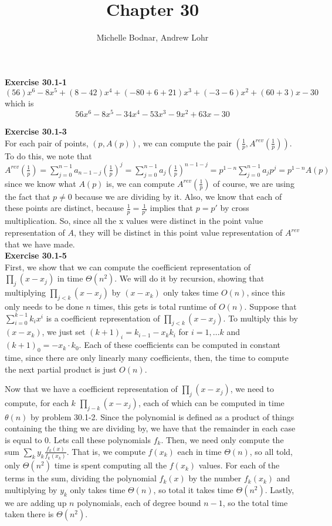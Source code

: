 \documentclass{article}
\title{Chapter 30}
\author{Michelle Bodnar, Andrew Lohr}
\begin{document}
\maketitle
\noindent\textbf{Exercise 30.1-1}\\
\[
(56)x^6 -8x^5 + (8-42)x^4 + (-80 + 6+21)x^3 + (-3-6)x^2 + (60+3)x -30
\]
which is 
\[
56x^6 - 8 x^5 -34x^4 - 53 x^3-9x^2+63x-30
\]

\noindent\textbf{Exercise 30.1-3}\\
For each pair of points, $(p,A(p))$, we can compute the pair $(\frac{1}{p}, A^{rev}(\frac{1}{p}))$. To do this, we note that $A^{rev}(\frac{1}{p}) = \sum_{j=0}^{n-1} a_{n-1-j} \left(\frac{1}{p}\right)^j = \sum_{j=0}^{n-1} a_{j} \left( \frac{1}{p}\right)^{n-1-j} = p^{1-n} \sum_{j=0}^{n-1} a_j p^j = p^{1-n} A(p)$ since we know what $A(p)$ is, we can compute $A^{rev}(\frac{1}{p})$ of course, we are using the fact that $p\neq0$ because we are dividing by it. Also, we know that each of these points are distinct, because $\frac{1}{p} = \frac{1}{p'}$  implies that $p=p'$ by cross multiplication. So, since all the x values were distinct in the point value representation of $A$, they will be distinct in this point value representation of $A^{rev}$ that we have made.\\

\noindent\textbf{Exercise 30.1-5}\\
First, we show that we can compute the coefficient representation of $\prod_{j} (x-x_j)$ in time $\Theta(n^2)$. We will do it by recursion, showing that multiplying $\prod_{j<k} (x-x_j)$ by $(x-x_k)$ only takes time $O(n)$, since this only needs to be done $n$ times, this gets is total runtime of $O(n)$. Suppose that $\sum_{i=0}^{k-1} {k_i}x^i$ is a coefficient representation of $\prod_{j<k} (x-x_j)$. To multiply this by $(x-x_k)$, we just set $(k+1)_i = k_{i-1} - x_k k_i$ for $i= 1,\ldots k$ and $(k+1)_0 = -x_k \cdot k_0$. Each of these coefficients can be computed in constant time, since there are only linearly many coefficients, then, the time to compute the next partial product is just $O(n)$.

Now that we have a coefficient representation of $\prod_j (x-x_j)$, we need to compute, for each $k$ $\prod_{j-k} (x-x_j)$, each of which can be computed in time $\theta(n)$ by problem 30.1-2. Since the polynomial is defined as a product of things containing the thing we are dividing by, we have that the remainder in each case is equal to 0. Lets call these polynomials $f_k$. Then, we need only compute the sum $\sum_{k} y_k \frac{f_k(x)}{f_k(x_k)}$. That is, we compute $f(x_k)$ each in time $\Theta(n)$, so all told, only $\Theta(n^2)$ time is spent computing all the $f(x_k)$ values. For each of the terms in the sum, dividing the polynomial $f_k(x)$ by the number $f_k(x_k)$ and multiplying by $y_k$ only takes time $\Theta(n)$, so total it takes time $\Theta(n^2)$. Lastly, we are adding up $n$ polynomials, each of degree bound $n-1$, so the total time taken there is $\Theta(n^2)$.\\
\end{document}
